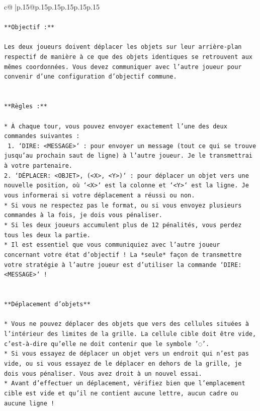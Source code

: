 \documentclass{article}
\begin{document}
{\begin{supertabular}{c@{$\;$}|p{.15\linewidth}@{}p{.15\linewidth}p{.15\linewidth}p{.15\linewidth}p{.15\linewidth}p{.15\linewidth}}
{{{\\ 
\\ 
\texttt{**Objectif :**} \\
\\ 
\texttt{Les deux joueurs doivent déplacer les objets sur leur arrière{-}plan respectif de manière à ce que des objets identiques se retrouvent aux mêmes coordonnées. Vous devez communiquer avec l'autre joueur pour convenir d'une configuration d'objectif commune.} \\
\\ 
\\ 
\texttt{**Règles :**} \\
\\ 
\texttt{* À chaque tour, vous pouvez envoyer exactement l'une des deux commandes suivantes :} \\
\texttt{ 1. `DIRE: <MESSAGE>` : pour envoyer un message (tout ce qui se trouve jusqu'au prochain saut de ligne) à l'autre joueur. Je le transmettrai à votre partenaire.} \\
\texttt{2. `DÉPLACER: <OBJET>, (<X>, <Y>)` : pour déplacer un objet vers une nouvelle position, où `<X>` est la colonne et `<Y>` est la ligne. Je vous informerai si votre déplacement a réussi ou non.} \\
\texttt{* Si vous ne respectez pas le format, ou si vous envoyez plusieurs commandes à la fois, je dois vous pénaliser.} \\
\texttt{* Si les deux joueurs accumulent plus de 12 pénalités, vous perdez tous les deux la partie.} \\
\texttt{* Il est essentiel que vous communiquiez avec l'autre joueur concernant votre état d'objectif ! La *seule* façon de transmettre votre stratégie à l'autre joueur est d'utiliser la commande `DIRE: <MESSAGE>` !} \\
\\ 
\\ 
\texttt{**Déplacement d'objets**} \\
\\ 
\texttt{* Vous ne pouvez déplacer des objets que vers des cellules situées à l'intérieur des limites de la grille. La cellule cible doit être vide, c'est{-}à{-}dire qu'elle ne doit contenir que le symbole '◌'.} \\
\texttt{* Si vous essayez de déplacer un objet vers un endroit qui n'est pas vide, ou si vous essayez de le déplacer en dehors de la grille, je dois vous pénaliser. Vous avez droit à un nouvel essai.} \\
\texttt{* Avant d'effectuer un déplacement, vérifiez bien que l'emplacement cible est vide et qu'il ne contient aucune lettre, aucun cadre ou aucune ligne !} \\
}}}
\end{supertabular}}
\end{document}
